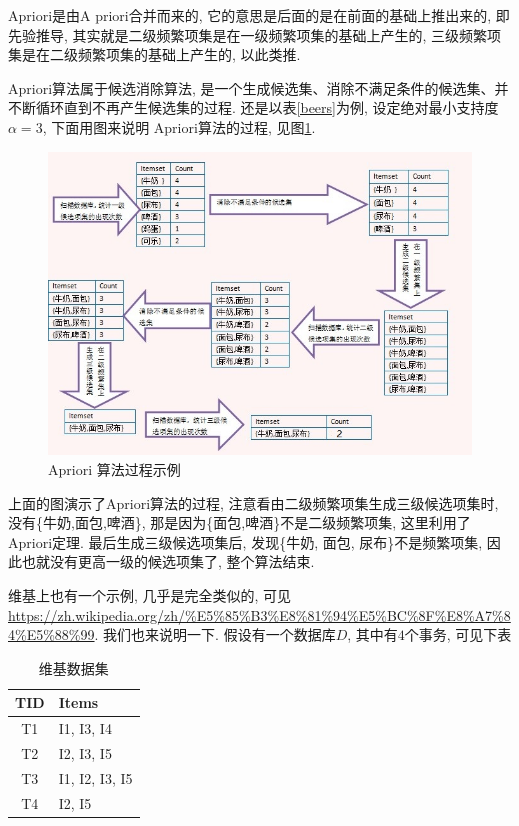 \documentclass[a4paper,UTF8]{ctexart}
\theoremstyle{plain} \newtheorem{theorem}{定理}[section]
\theoremstyle{plain} \newtheorem{definition}{定义}[section]
\theoremstyle{plain} \newtheorem{lemma}{引理}[section]
\theoremstyle{plain} \newtheorem{proposition}{命题}[section]
\theoremstyle{plain} \newtheorem{example}{例}[section]
\theoremstyle{plain} \newtheorem{remark}{注}[section]
\theoremstyle{plain} \newtheorem{corollary}{推论}[section]
\begin{document}
Apriori是由A priori合并而来的, 它的意思是后面的是在前面的基础上推出来的, 即先验推导, 其实就是二级频繁项集是在一级频繁项集的基础上产生的, 三级频繁项集是在二级频繁项集的基础上产生的, 以此类推.

Apriori算法属于候选消除算法, 是一个生成候选集、消除不满足条件的候选集、并不断循环直到不再产生候选集的过程. 还是以表\ref{beers}为例, 设定绝对最小支持度$\alpha = 3$, 下面用图来说明 Apriori算法的过程, 见图\ref{apbeers}.
\begin{figure}[!htb]
	\centering
	\includegraphics[width = 0.85 \textwidth]{beers.jpg}
	\caption{Apriori 算法过程示例}
	\label{apbeers}
\end{figure}

上面的图演示了Apriori算法的过程, {\color{red}注意看由二级频繁项集生成三级候选项集时, 没有\{牛奶,面包,啤酒\}, 那是因为\{面包,啤酒\}不是二级频繁项集, 这里利用了Apriori定理}. 最后生成三级候选项集后, 发现\{牛奶, 面包, 尿布\}不是频繁项集, 因此也就没有更高一级的候选项集了, 整个算法结束.

维基上也有一个示例, 几乎是完全类似的, 可见\url{https://zh.wikipedia.org/zh/%E5%85%B3%E8%81%94%E5%BC%8F%E8%A7%84%E5%88%99}. 我们也来说明一下. 假设有一个数据库$D$, 其中有$4$个事务, 可见下表
\begin{table}[!htb]
\centering
\caption{维基数据集}
\label{wiki}
\begin{tabular}{c|l}
	\hline
    \textbf{TID} & \textbf{Items}  \\
    \hline
    T1 & I1, I3, I4 \\
    \hline
    T2 & I2, I3, I5 \\
    \hline
    T3 & I1, I2, I3, I5 \\
    \hline
    T4 & I2, I5 \\
	\hline
\end{tabular}
\end{table}
\end{document}
